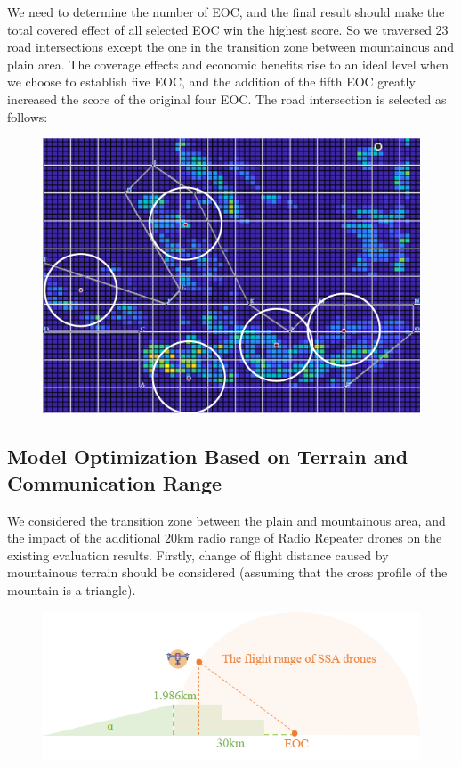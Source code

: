 \documentclass{mcmthesis}
\begin{document}
We need to determine the number of EOC, and the final result should make the total covered effect of all selected EOC win the highest score. So we traversed 23 road intersections except the one in the transition zone between mountainous and plain area. The coverage effects and economic benefits rise to an ideal level when we choose to establish five EOC, and the addition of the fifth EOC greatly increased the score of the original four EOC. The road intersection is selected as follows:

\begin{figure}[H]
  \centering
  \includegraphics[scale=0.4]{image/6.png}
\end{figure}


\subsection{Model Optimization Based on Terrain and Communication Range}

We considered the transition zone between the plain and mountainous area, and the impact of the additional 20km radio range of Radio Repeater drones on the existing evaluation results. Firstly, change of flight distance caused by mountainous terrain should be considered (assuming that the cross profile of the mountain is a triangle).

\begin{figure}[H]
  \centering
  \includegraphics[scale=0.4]{image/7.png}
\end{figure}
\end{document}
